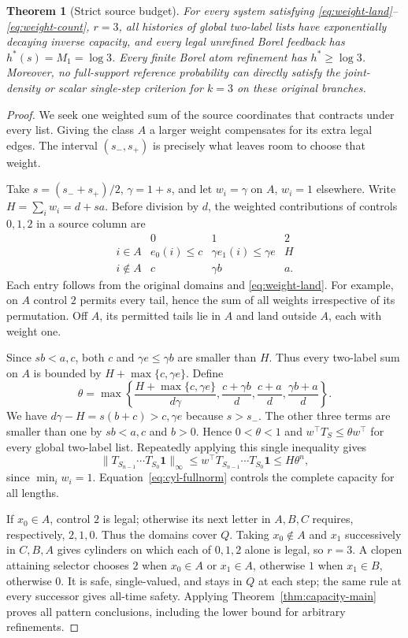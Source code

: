 \documentclass[11pt,reqno]{amsart}
\numberwithin{equation}{section}
\newtheorem{theorem}{Theorem}[section]
\theoremstyle{definition}
\theoremstyle{definition}
\newcommand{\one}{\mathbf 1}
\begin{document}
\begin{theorem}[Strict source budget]\label{thm:source-weight}
For every system satisfying \eqref{eq:weight-land}--\eqref{eq:weight-count},
$r=3$, all histories of global two-label lists have exponentially
decaying inverse capacity, and every legal unrefined Borel feedback
has $h^*(s)=M_1=\log3$. Every finite Borel atom refinement has
$h^*\ge\log3$. Moreover, no full-support reference probability
can directly satisfy the joint-density or scalar single-step
criterion for $k=3$ on these original branches.
\end{theorem}
\begin{proof}
We seek one weighted sum of the source coordinates that contracts
under every list. Giving the class $A$ a larger weight compensates
for its extra legal edges. The interval $(s_-,s_+)$ is precisely
what leaves room to choose that weight.

Take $s=(s_-+s_+)/2$, $\gamma=1+s$, and let $w_i=\gamma$
on $A$, $w_i=1$ elsewhere. Write $H=\sum_iw_i=d+sa$.
Before division by $d$, the weighted contributions of controls
$0,1,2$ in a source column are
\[
\begin{array}{c|ccc}
 &0&1&2\\\hline
 i\in A&e_0(i)\le c&\gamma e_1(i)\le\gamma e&H\\
 i\notin A&c&\gamma b&a.
\end{array}
\]
Each entry follows from the original domains and
\eqref{eq:weight-land}. For example, on $A$ control $2$ permits
every tail, hence the sum of all weights irrespective of its
permutation. Off $A$, its permitted tails lie in $A$ and land
outside $A$, each with weight one.

Since $sb<a,c$, both $c$ and $\gamma e\le\gamma b$ are smaller
than $H$. Thus every two-label sum on $A$ is bounded by
$H+\max\{c,\gamma e\}$. Define
\[
 \theta=\max\left\{
 \frac{H+\max\{c,\gamma e\}}{d\gamma},
 \frac{c+\gamma b}{d},\frac{c+a}{d},\frac{\gamma b+a}{d}
 \right\}.
\]
We have $d\gamma-H=s(b+c)>c,\gamma e$ because $s>s_-$.
The other three terms are smaller than one by $sb<a,c$ and
$b>0$. Hence $0<\theta<1$ and
$w^\top T_S\le\theta w^\top$ for every global two-label list.
Repeatedly applying this single inequality gives
\[
 \|T_{S_{n-1}}\cdots T_{S_0}\one\|_\infty
 \le w^\top T_{S_{n-1}}\cdots T_{S_0}\one
 \le H\theta^n,
\]
since $\min_iw_i=1$. Equation~\eqref{eq:cyl-fullnorm} controls
the complete capacity for all lengths.

If $x_0\in A$, control $2$ is legal; otherwise its next letter
in $A,B,C$ requires, respectively, $2,1,0$. Thus the domains
cover $Q$. Taking $x_0\notin A$ and $x_1$ successively in
$C,B,A$ gives cylinders on which each of $0,1,2$ alone is legal,
so $r=3$. A clopen attaining selector chooses $2$ when $x_0\in A$
or $x_1\in A$, otherwise $1$ when $x_1\in B$, otherwise $0$.
It is safe, single-valued, and stays in $Q$ at each step; the same
rule at every successor gives all-time safety. Applying
Theorem~\ref{thm:capacity-main} proves all pattern conclusions,
including the lower bound for arbitrary refinements.


\end{proof}
\end{document}

